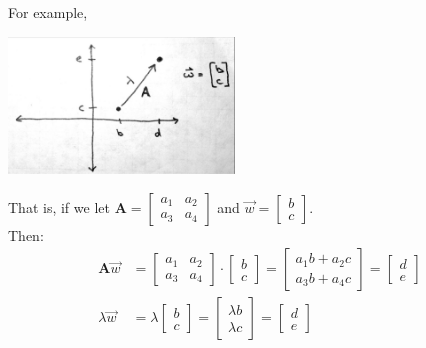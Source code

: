 \documentclass{article}
\begin{document}
For example, 
\begin{center}
	\includegraphics[width=6cm]{figs/eigen1.pdf}
\end{center}

That is,  if we let $\mathbf{A}  = \begin{bmatrix} a_1 & a_2 \\ a_3 & a_4 \end{bmatrix}$ and $\vec{w} = \begin{bmatrix}b \\ c \end{bmatrix}$.\\
Then:
\begin{align*}
	\mathbf{A} \vec{w} &= \begin{bmatrix} a_1 & a_2 \\ a_3 & a_4 \end{bmatrix} \cdot \begin{bmatrix} b \\ c\end{bmatrix} = \begin{bmatrix} a_1 b +  a_2 c \\ a_3 b + a_4 c \end{bmatrix} = \begin{bmatrix} d \\ e \end{bmatrix}\\
	\lambda \vec{w} &= \lambda \begin{bmatrix}b \\ c \end{bmatrix}=  \begin{bmatrix}\lambda b \\ \lambda c \end{bmatrix}  = \begin{bmatrix} d \\ e \end{bmatrix}
\end{align*}
\end{document}
